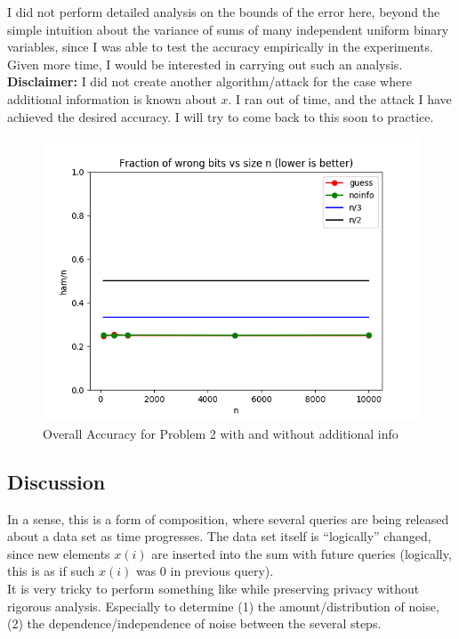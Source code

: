 \noindent I did not perform detailed analysis on the bounds of the error here, beyond the simple intuition about the variance of sums of many independent uniform binary variables, since I was able to test the accuracy empirically in the experiments. Given more time, I would be interested in carrying out such an analysis. \\

\noindent \textbf{Disclaimer:} I did not create another algorithm/attack for the case where additional information is known about $x$. I ran out of time, and the attack I have achieved the desired accuracy. I will try to come back to this soon to practice.

\begin{figure}
    \centering
    \includegraphics[width=\textwidth]{counter/all.png}
    \caption{Overall Accuracy for Problem 2 with and without additional info}
    \label{fig:counter}
\end{figure}

\subsection{Discussion}
In a sense, this is a form of composition, where several queries are being released about a data set as time progresses. The data set itself is ``logically'' changed, since new elements $x(i)$ are inserted into the sum with future queries (logically, this is as if such $x(i)$ was 0 in previous query). \\

\noindent It is very tricky to perform something like while preserving privacy without rigorous analysis. Especially to determine (1) the amount/distribution of noise, (2) the dependence/independence of noise between the several steps. \\

